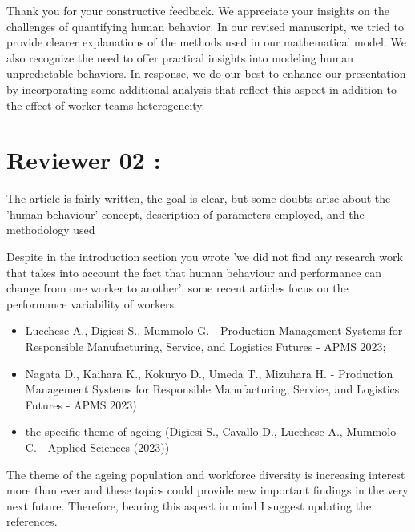\documentclass[preprint,11pt,3p]{elsarticle}
\begin{document}
\begin{tcolorbox}[colback=r_color1,colframe=r_color2,title=Response Q21:]
    Thank you for your constructive feedback. We appreciate your insights on the challenges of quantifying human behavior. In our revised manuscript, we tried to provide clearer explanations of the methods used in our mathematical model.
    We also recognize the need to offer practical insights into modeling human unpredictable behaviors. In response, we do our best to enhance our presentation by incorporating some additional analysis that reflect this aspect in addition to the effect of worker teams heterogeneity.
     
\end{tcolorbox}


\newpage
\section{Reviewer 02 : }
The article is fairly written, the goal is clear, but some doubts arise about the 'human behaviour' concept, description of parameters employed, and the methodology used

\begin{tcolorbox}[colback=q_color1,colframe=q_color2,title=Q1  :]
	Despite in the introduction section you wrote 'we did not find any research work that takes into account the fact that human behaviour and performance can change from one worker to another', some recent articles focus on the performance variability of workers  
	\begin{itemize}
		 
		\item \cite{lucchese2023stochastic} Lucchese A., Digiesi S., Mummolo G. - Production Management Systems for Responsible Manufacturing, Service, and Logistics Futures - APMS 2023; 
		\item \cite{nagata2023proposal} Nagata D., Kaihara K., Kokuryo D., Umeda T., Mizuhara H. - Production Management Systems for Responsible Manufacturing, Service, and Logistics Futures - APMS 2023)
		\item  \cite{digiesi2020human}  the specific theme of ageing (Digiesi S., Cavallo D., Lucchese A., Mummolo C. - Applied Sciences (2023))
	\end{itemize}
	The theme of the ageing population and workforce diversity is increasing interest more than ever and these topics could provide new important findings in the very next future. Therefore, bearing this aspect in mind I suggest updating the references.
 
\end{tcolorbox}
\end{document}
